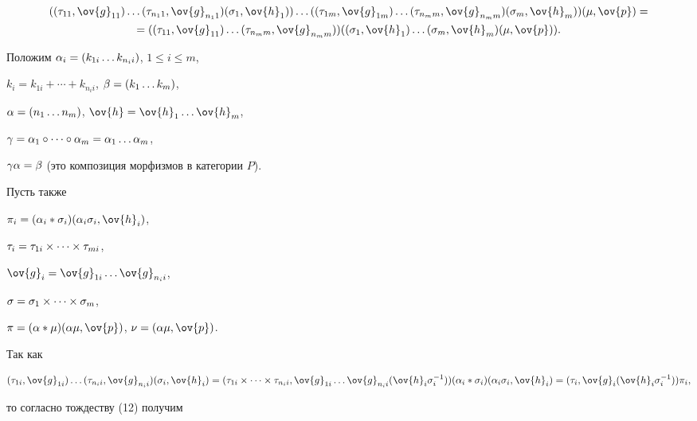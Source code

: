 \begin{pf}
\begin{multline}


((\t_{11},\ov{g}_{11}) \dotsc (\t_{{n_1}1},\ov{g}_{{n_1}1})


(\s_1,\ov{h}_1)) \dotsc ((\t_{1m},\ov{g}_{1m}) \dotsc (\t_{{n_m}m},


\ov{g}_{{n_m}m})(\s_m,\ov{h}_m)) (\mu,\ov{p})= \\


=((\t_{11},\ov{g}_{11}) \dotsc (\t_{{n_m}m},\ov{g}_{{n_m}m}))


((\s_1,\ov{h}_1) \dotsc (\s_m,\ov{h}_m) (\mu,\ov{p})).


\end{multline}





Положим $\alpha_i=(k_{1i} \dotsc k_{n_{i}i})$, $1\le i \le m$,


$k_i=k_{1 i} + \dotsb + k_{n_{i}i}$, $\beta=(k_1 \dotsc k_m)$,


$\alpha=(n_1 \dotsc n_m)$, $\ov{h}=\ov{h}_1 \dotsc \ov{h}_m$,


$\gamma=\alpha_1\circ \dotsb \circ \alpha_m=\alpha_1 \dotsc \alpha_m$,


$\gamma\alpha=\beta$ (это композиция морфизмов в категории $P$).


Пусть также


$\pi_i=(\al_i * \s_i)(\al_i\s_i,\ov{h}_i)$,


$\tau_i=\tau_{1i} \times \dotsb \times \tau_{mi}$,


$\ov{g}_i=\ov{g}_{1i} \dotsc \ov{g}_{{n_i}i}$,


$\sigma=\sigma_1 \times \dotsb \times \sigma_{m}$,


$\pi=(\al *\mu)(\al\mu,\ov{p})$, $\nu=(\al\mu,\ov{p})$.





Так как


$$


(\t_{1i},\ov{g}_{1i}) \dotsc (\t_{{n_i}i},\ov{g}_{{n_i}i})(\s_i,\ov{h}_i)=


(\t_{1i} \times \dotsb \times \t_{{n_i}i},


\ov{g}_{1i} \dotsc \ov{g}_{{n_i}i}(\ov{h}_i


\s_i^{-1}))(\al_i * \s_i)(\al_i\s_i,\ov{h}_i)=


( \t_i,\ov{g}_i(\ov{h}_i \s_i^{-1}))\pi_i,


$$


то согласно тождеству (12) получим


\begin{gather*}



\end{gather*}
\end{pf}

